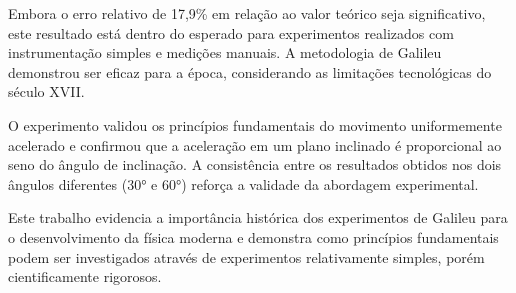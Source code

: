 \documentclass[a4paper, 12pt]{article}
\begin{document}
Embora o erro relativo de 17,9\% em relação ao valor teórico seja significativo, este resultado está dentro do esperado para experimentos realizados com instrumentação simples e medições manuais. A metodologia de Galileu demonstrou ser eficaz para a época, considerando as limitações tecnológicas do século XVII.

O experimento validou os princípios fundamentais do movimento uniformemente acelerado e confirmou que a aceleração em um plano inclinado é proporcional ao seno do ângulo de inclinação. A consistência entre os resultados obtidos nos dois ângulos diferentes (30° e 60°) reforça a validade da abordagem experimental.

Este trabalho evidencia a importância histórica dos experimentos de Galileu para o desenvolvimento da física moderna e demonstra como princípios fundamentais podem ser investigados através de experimentos relativamente simples, porém cientificamente rigorosos.




\end{document}
